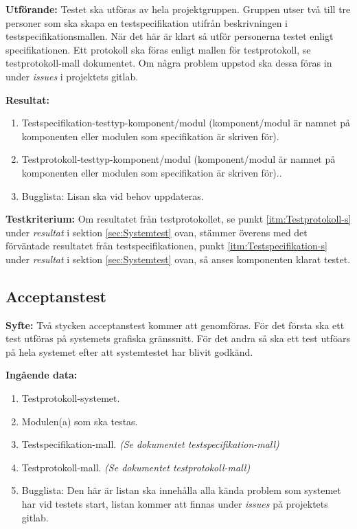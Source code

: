 \documentclass[a4paper,10pt]{article}
\begin{document}
\textbf{Utförande:} Testet ska utföras av hela projektgruppen. Gruppen utser två till tre personer som ska skapa en testspecifikation utifrån beskrivningen i testspecifikationsmallen. När det här är klart så utför personerna testet enligt specifikationen. Ett protokoll ska föras enligt mallen för testprotokoll, se testprotokoll-mall dokumentet. Om några problem uppstod ska dessa föras in under \emph{issues} i projektets gitlab.

\textbf{Resultat:}
    \begin{enumerate}
        \item \label{itm:Testspecifikation-s} Testspecifikation-testtyp-komponent/modul (komponent/modul är namnet på komponenten eller modulen som specifikation är skriven för).
        \item \label{itm:Testprotokoll-s} Testprotokoll-testtyp-komponent/modul (komponent/modul är namnet på komponenten eller modulen som specifikation är skriven för)..
        \item Bugglista: Lisan ska vid behov uppdateras.
    \end{enumerate}

\textbf{Testkriterium:} Om resultatet från testprotokollet, se punkt \ref{itm:Testprotokoll-s} under \emph{resultat} i sektion \ref{sec:Systemtest} ovan, stämmer överens med det förväntade resultatet från testspecifikationen, punkt \ref{itm:Testspecifikation-s} under \emph{resultat} i sektion \ref{sec:Systemtest} ovan, så anses komponenten klarat testet.

\subsection{Acceptanstest}
\textbf{Syfte:}
Två stycken acceptanstest kommer att genomföras. För det första ska ett test utföras på systemets grafiska gränssnitt.  För det andra så ska ett test utföars på hela systemet efter att systemtestet har blivit godkänd.

\textbf{Ingående data:}
        \begin{enumerate}
            \item Testprotokoll-systemet.
            \item Modulen(a) som ska testas.
            \item Testspecifikation-mall. \emph{(Se dokumentet testspecifikation-mall)}
            \item Testprotokoll-mall. \emph{(Se dokumentet testprotokoll-mall)}
            \item Bugglista: Den här är listan ska innehålla alla kända problem som systemet har vid testets start, listan kommer att finnas under \emph{issues} på projektets gitlab.
        \end{enumerate}
\end{document}

